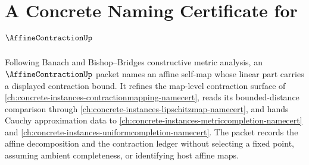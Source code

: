 \chapter{A Concrete Naming Certificate for $\AffineContractionUp$}
\label{ch:concrete-instances-affine-contraction-namecert}

Following Banach and Bishop--Bridges constructive metric analysis, an $\AffineContractionUp$ packet names an affine self-map whose linear part carries a displayed contraction bound. It refines the map-level contraction surface of \autoref{ch:concrete-instances-contractionmapping-namecert}, reads its bounded-distance comparison through \autoref{ch:concrete-instances-lipschitzmap-namecert}, and hands Cauchy approximation data to \autoref{ch:concrete-instances-metriccompletion-namecert} and \autoref{ch:concrete-instances-uniformcompletion-namecert}. The packet records the affine decomposition and the contraction ledger without selecting a fixed point, assuming ambient completeness, or identifying host affine maps.


